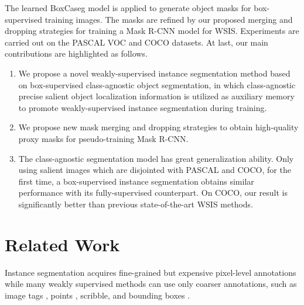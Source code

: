 \documentclass[final]{cvpr}
\begin{document}
The learned BoxCaseg model is applied to generate object masks for box-supervised training images. The masks are refined by our proposed merging and dropping strategies for training a Mask R-CNN model for WSIS. Experiments are carried out on the PASCAL VOC and COCO datasets. At last, our main contributions are highlighted as follows. \vspace{-2mm}
\begin{enumerate}
\item We propose a novel weakly-supervised instance segmentation method based on box-supervised class-agnostic object segmentation, in which class-agnostic precise salient object localization information is utilized as auxiliary memory to promote weakly-supervised instance segmentation during training.
\vspace{-2mm}
\item We propose new mask merging and dropping strategies to obtain high-quality proxy masks for pseudo-training Mask R-CNN.
\vspace{-2mm}
\item The class-agnostic segmentation model has great generalization ability. Only using  salient images which are disjointed with PASCAL and COCO, for the first time, a box-supervised instance segmentation obtains similar performance with its fully-supervised counterpart. On COCO, our result is significantly better than previous state-of-the-art WSIS methods.
\end{enumerate}




\vspace{-3mm}
\section{Related Work}
\vspace{-1mm}

Instance segmentation acquires fine-grained but expensive pixel-level annotations while many weakly supervised methods can use only coarser annotations, such as image tags \cite{ahn2019weakly,cholakkal2019object,ge2019label,laradji2019masks,zhou2018weakly,zhu2019learning}, points \cite{laradji2019instance}, scribble\cite{lin2016scribblesup,tang2018normalized}, and bounding boxes \cite{arun2020weakly,hsu2019weakly,khoreva2017simple, tian2020boxinst, bbam}.
\end{document}
